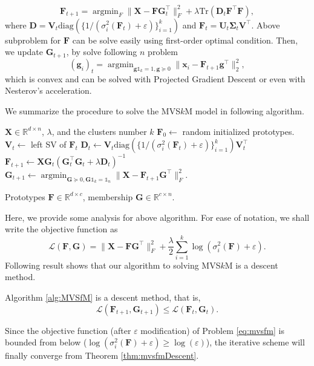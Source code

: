 \documentclass[journal]{IEEEtran}
\begin{document}
\[
\mathbf{F}_{t+1} = \mathop{\arg\min}_{F} \| \mathbf{X} - \mathbf{F}\mathbf{G}_t^\top \|^2_F + \lambda \text{Tr}\left(\mathbf{D}_t\mathbf{F}^\top\mathbf{F}\right),
\]
where $\mathbf{D} = \mathbf{V}_t \text{diag}\left( \{ 1/(\sigma_i^2(\mathbf{F}_t)+\varepsilon)  \}_{i=1}^{k} \right)$ and $\mathbf{F}_t = \mathbf{U}_t\mathbf{\Sigma}_t\mathbf{V}^\top$. Above subproblem for $\mathbf{F}$ can be solve easily using first-order optimal condition. Then, we update $\mathbf{G}_{t+1}$, by solve following $n$ problem
\[
(\mathbf{g}_i)_t = \mathop{\arg\min}_{\mathbf{g}\mathbb{1}_k = 1, \mathbf{g} \succeq 0} \| \mathbf{x}_i - \mathbf{F}_{t+1}\mathbf{g}^\top \|_2^2,
\]
which is convex and can be solved with Projected Gradient Descent or even with Nesterov's acceleration.

We summarize the procedure to solve the MVS$k$M model in following algorithm.

\begin{algorithm}[H]  
	\caption{Solve the MVS$k$M Problem}  
	\label{alg:MVSfM}
	\begin{algorithmic}[1]  
		\Require $\mathbf{X}\in\mathbb{R}^{d\times n}$, $\lambda$, and the clusters number $k$
		\State $\mathbf{F}_0 \leftarrow$ random initialized prototypes.
		\Repeat
		\State $\mathbf{V}_t \leftarrow$ left SV of $\mathbf{F}_t$
		\State $\mathbf{D}_t \leftarrow\mathbf{V}_t \text{diag}(\{ 1/(\sigma_i^2(\mathbf{F}_t) + \varepsilon) \}_{i=1}^k) \mathbf{V}_t^\top$
		\State $\mathbf{F}_{t+1} \leftarrow \mathbf{X}\mathbf{G}_t(\mathbf{G}_t^\top\mathbf{G}_t + \lambda \mathbf{D}_t)^{-1}$
		\State $\displaystyle \mathbf{G}_{t+1} \leftarrow \mathop{\arg\min}_{\mathbf{G}\succeq 0,\mathbf{G}\mathbb{1}_k = \mathbb{1}_n} \| \mathbf{X} - \mathbf{F}_{t+1}\mathbf{G}^\top\|_F^2.$
		
		\Ensure Prototypes $\mathbf{F} \in \mathbb{R}^{d\times c}$, membership $\mathbf{G} \in \mathbb{R}^{c \times n}$.
	\end{algorithmic}  
\end{algorithm} 

Here, we provide some analysis for above algorithm. For ease of notation, we shall write the objective function as
\[
\mathcal{L}(\mathbf{F}, \mathbf{G})=\| \mathbf{X} - \mathbf{F}\mathbf{G}^\top\|_F^2 + \frac{\lambda}{2} \sum_{i=1}^k \log(\sigma_i^2(\mathbf{F}) + \varepsilon).
\]
Following result shows that our algorithm to solving MVS$k$M is a descent method.
\begin{thm}[Descent]\label{thm:mvsfmDescent}
	Algorithm \ref{alg:MVSfM} is a descent method, that is,
	\[
	\mathcal{L}(\mathbf{F}_{t+1}, \mathbf{G}_{t+1}) \leq \mathcal{L}(\mathbf{F}_{t}, \mathbf{G}_{t}).
	\]
\end{thm}
Since the objective function (after $\varepsilon$ modification) of Problem \eqref{eq:mvsfm} is bounded from below ($\log(\sigma_i^2(\mathbf{F}) + \varepsilon) \geq \log(\varepsilon)$), the iterative scheme will finally converge from Theorem \ref{thm:mvsfmDescent}.
%
\end{document}
